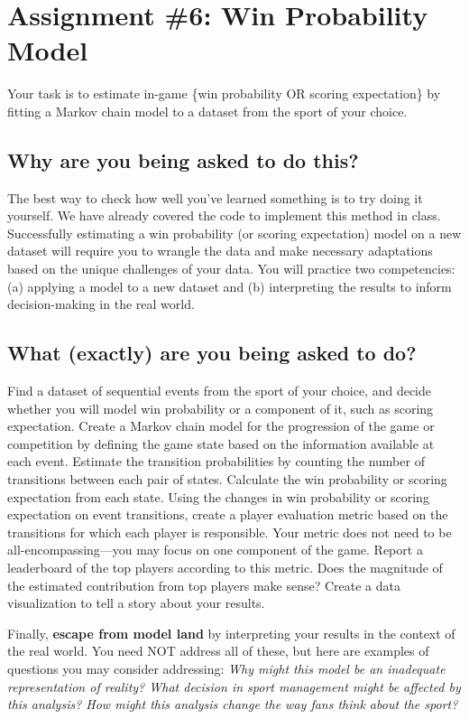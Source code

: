 \documentclass{article}
\begin{document}
  \section*{\sc Assignment \#6: Win Probability Model}

    Your task is to estimate in-game \{win probability OR scoring expectation\} by fitting a Markov chain model to a dataset from the sport of your choice.
  
    \subsection*{\sc Why are you being asked to do this?}

      The best way to check how well you've learned something is to try doing it yourself. We have already covered the code to implement this method in class. Successfully estimating a win probability (or scoring expectation) model on a new dataset will require you to wrangle the data and make necessary adaptations based on the unique challenges of your data. You will practice two competencies: (a) applying a model to a new dataset and (b) interpreting the results to inform decision-making in the real world.

    \subsection*{\sc What (exactly) are you being asked to do?}

      Find a dataset of sequential events from the sport of your choice, and decide whether you will model win probability or a component of it, such as scoring expectation. Create a Markov chain model for the progression of the game or competition by defining the game state based on the information available at each event. Estimate the transition probabilities by counting the number of transitions between each pair of states. Calculate the win probability or scoring expectation from each state. Using the changes in win probability or scoring expectation on event transitions, create a player evaluation metric based on the transitions for which each player is responsible. Your metric does not need to be all-encompassing---you may focus on one component of the game. Report a leaderboard of the top players according to this metric. Does the magnitude of the estimated contribution from top players make sense? Create a data visualization to tell a story about your results.

      Finally, {\bf escape from model land} by interpreting your results in the context of the real world. You need NOT address all of these, but here are examples of questions you may consider addressing: {\it Why might this model be an inadequate representation of reality? What decision in sport management might be affected by this analysis? How might this analysis change the way fans think about the sport?}
\end{document}
